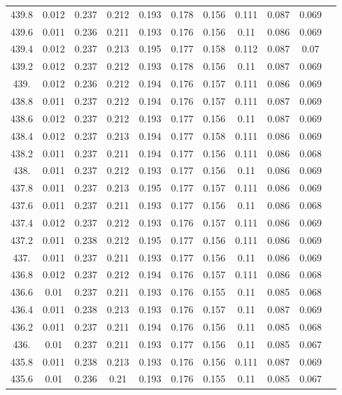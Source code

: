 \documentclass[12pt]{ctexart}
\numberwithin{equation}{section}
\begin{document}
\begin{longtable}{ccccccccccc}
439.8	&	0.012	&	0.237	&	0.212	&	0.193	&	0.178	&	0.156	&	0.111	&	0.087	&	0.069	\\
439.6	&	0.011	&	0.236	&	0.211	&	0.193	&	0.176	&	0.156	&	0.11	&	0.086	&	0.069	\\
439.4	&	0.012	&	0.237	&	0.213	&	0.195	&	0.177	&	0.158	&	0.112	&	0.087	&	0.07	\\
439.2	&	0.012	&	0.237	&	0.212	&	0.193	&	0.178	&	0.156	&	0.11	&	0.087	&	0.069	\\
439.	&	0.012	&	0.236	&	0.212	&	0.194	&	0.176	&	0.157	&	0.111	&	0.086	&	0.069	\\
438.8	&	0.011	&	0.237	&	0.212	&	0.194	&	0.176	&	0.157	&	0.111	&	0.087	&	0.069	\\
438.6	&	0.012	&	0.237	&	0.212	&	0.193	&	0.177	&	0.156	&	0.11	&	0.087	&	0.069	\\
438.4	&	0.012	&	0.237	&	0.213	&	0.194	&	0.177	&	0.158	&	0.111	&	0.086	&	0.069	\\
438.2	&	0.011	&	0.237	&	0.211	&	0.194	&	0.177	&	0.156	&	0.111	&	0.086	&	0.068	\\
438.	&	0.011	&	0.237	&	0.212	&	0.193	&	0.177	&	0.156	&	0.11	&	0.086	&	0.069	\\
437.8	&	0.011	&	0.237	&	0.213	&	0.195	&	0.177	&	0.157	&	0.111	&	0.086	&	0.069	\\
437.6	&	0.011	&	0.237	&	0.211	&	0.193	&	0.177	&	0.156	&	0.11	&	0.086	&	0.068	\\
437.4	&	0.012	&	0.237	&	0.212	&	0.193	&	0.176	&	0.157	&	0.111	&	0.086	&	0.069	\\
437.2	&	0.011	&	0.238	&	0.212	&	0.195	&	0.177	&	0.156	&	0.111	&	0.086	&	0.069	\\
437.	&	0.011	&	0.237	&	0.211	&	0.193	&	0.177	&	0.156	&	0.11	&	0.086	&	0.069	\\
436.8	&	0.012	&	0.237	&	0.212	&	0.194	&	0.176	&	0.157	&	0.111	&	0.086	&	0.068	\\
436.6	&	0.01	&	0.237	&	0.211	&	0.193	&	0.176	&	0.155	&	0.11	&	0.085	&	0.068	\\
436.4	&	0.011	&	0.238	&	0.213	&	0.193	&	0.176	&	0.157	&	0.11	&	0.087	&	0.069	\\
436.2	&	0.011	&	0.237	&	0.211	&	0.194	&	0.176	&	0.156	&	0.11	&	0.085	&	0.068	\\
436.	&	0.01	&	0.237	&	0.211	&	0.193	&	0.177	&	0.156	&	0.11	&	0.085	&	0.067	\\
435.8	&	0.011	&	0.238	&	0.213	&	0.193	&	0.176	&	0.156	&	0.111	&	0.087	&	0.069	\\
435.6	&	0.01	&	0.236	&	0.21	&	0.193	&	0.176	&	0.155	&	0.11	&	0.085	&	0.067	\\

\end{longtable}
\end{document}

